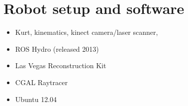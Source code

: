 \documentclass[Thesis.tex]{subfiles}
\begin{document}
\chapter{Robot setup and software}
\begin{itemize}
	\item Kurt, kinematics, kinect camera/laser scanner,
  \item ROS Hydro (released 2013)
  \item Las Vegas Reconstruction Kit
  \item CGAL Raytracer
  \item Ubuntu 12.04 
\end{itemize}
\end{document}
